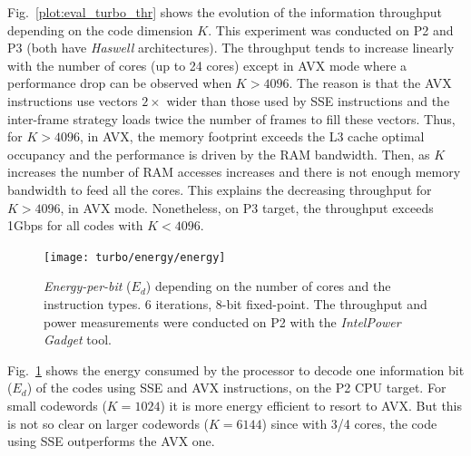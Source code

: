 Fig.~\ref{plot:eval_turbo_thr} shows the evolution of the information throughput
depending on the code dimension $K$. This experiment was conducted on P2 and P3
(both have \emph{ Haswell} architectures). The throughput tends to increase
linearly with the number of cores (up to 24 cores) except in AVX mode where a
performance drop can be observed when $K > 4096$. The reason is that the AVX
instructions use vectors $2\times$ wider than those used by SSE instructions and
the inter-frame strategy loads twice the number of frames to fill these vectors.
Thus, for $K > 4096$, in AVX, the memory footprint exceeds the L3 cache optimal
occupancy and the performance is driven by the RAM bandwidth. Then, as $K$
increases the number of RAM accesses increases and there is not enough memory
bandwidth to feed all the cores. This explains the decreasing throughput for
$K > 4096$, in AVX mode. Nonetheless, on P3 target, the throughput exceeds 1Gbps
for all codes with $K<4096$.

\begin{figure}
  \centering
  \texttt{[image: turbo/energy/energy]}
  \caption{\emph{Energy-per-bit} ($E_d$) depending on the number of cores and
    the instruction types. 6 iterations, 8-bit fixed-point. The throughput and
    power measurements were conducted on P2 with the
    \emph{Intel\R Power Gadget} tool.}
  \label{plot:eval_turbo_energy}
\end{figure}

Fig.~\ref{plot:eval_turbo_energy} shows the energy consumed by the processor to
decode one information bit ($E_d$) of the codes using SSE and AVX instructions,
on the P2 CPU target. For small codewords ($K=1024$) it is more energy efficient
to resort to AVX. But this is not so clear on larger codewords ($K=6144$) since
with 3/4 cores, the code using SSE outperforms the AVX one.

